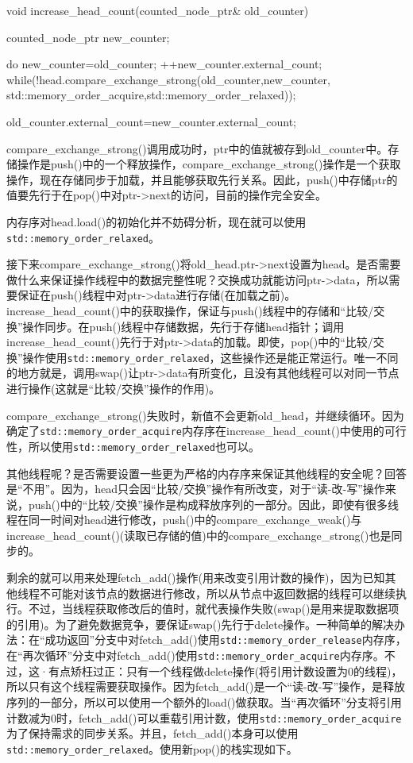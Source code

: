 \begin{cpp}
void increase_head_count(counted_node_ptr& old_counter)
{
  counted_node_ptr new_counter;

  do
  {
    new_counter=old_counter;
    ++new_counter.external_count;
  }
  while(!head.compare_exchange_strong(old_counter,new_counter,
        std::memory_order_acquire,std::memory_order_relaxed));

  old_counter.external_count=new_counter.external_count;
}
\end{cpp}

compare\_exchange\_strong()调用成功时，ptr中的值就被存到old\_counter中。存储操作是push()中的一个释放操作，compare\_exchange\_strong()操作是一个获取操作，现在存储同步于加载，并且能够获取先行关系。因此，push()中存储ptr的值要先行于在pop()中对ptr->next的访问，目前的操作完全安全。

内存序对head.load()的初始化并不妨碍分析，现在就可以使用\texttt{std::memory\_order\_relaxed}。

接下来compare\_exchange\_strong()将old\_head.ptr->next设置为head。是否需要做什么来保证操作线程中的数据完整性呢？交换成功就能访问ptr->data，所以需要保证在push()线程中对ptr->data进行存储(在加载之前)。increase\_head\_count()中的获取操作，保证与push()线程中的存储和“比较/交换”操作同步。在push()线程中存储数据，先行于存储head指针；调用increase\_head\_count()先行于对ptr->data的加载。即使，pop()中的“比较/交换”操作使用\texttt{std::memory\_order\_relaxed}，这些操作还是能正常运行。唯一不同的地方就是，调用swap()让ptr->data有所变化，且没有其他线程可以对同一节点进行操作(这就是“比较/交换”操作的作用)。

compare\_exchange\_strong()失败时，新值不会更新old\_head，并继续循环。因为确定了\texttt{std::memory\_order\_acquire}内存序在increase\_head\_count()中使用的可行性，所以使用\texttt{std::memory\_order\_relaxed}也可以。

其他线程呢？是否需要设置一些更为严格的内存序来保证其他线程的安全呢？回答是“不用”。因为，head只会因“比较/交换”操作有所改变，对于“读-改-写”操作来说，push()中的“比较/交换”操作是构成释放序列的一部分。因此，即使有很多线程在同一时间对head进行修改，push()中的compare\_exchange\_weak()与increase\_head\_count()(读取已存储的值)中的compare\_exchange\_strong()也是同步的。

剩余的就可以用来处理fetch\_add()操作(用来改变引用计数的操作)，因为已知其他线程不可能对该节点的数据进行修改，所以从节点中返回数据的线程可以继续执行。不过，当线程获取修改后的值时，就代表操作失败(swap()是用来提取数据项的引用)。为了避免数据竞争，要保证swap()先行于delete操作。一种简单的解决办法：在“成功返回”分支中对fetch\_add()使用\texttt{std::memory\_order\_release}内存序，在“再次循环”分支中对fetch\_add()使用\texttt{std::memory\_order\_acquire}内存序。不过，这·有点矫枉过正：只有一个线程做delete操作(将引用计数设置为0的线程)，所以只有这个线程需要获取操作。因为fetch\_add()是一个“读-改-写”操作，是释放序列的一部分，所以可以使用一个额外的load()做获取。当“再次循环”分支将引用计数减为0时，fetch\_add()可以重载引用计数，使用\texttt{std::memory\_order\_acquire}为了保持需求的同步关系。并且，fetch\_add()本身可以使用\texttt{std::memory\_order\_relaxed}。使用新pop()的栈实现如下。


